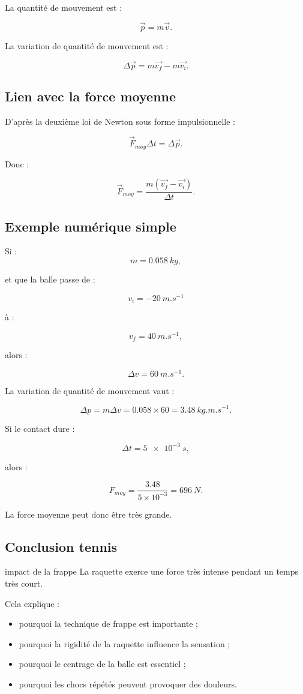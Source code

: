 \documentclass[11pt,a4paper]{article}
\begin{document}
La quantité de mouvement est :

\[
\vec{p}=m\vec{v}.
\]

La variation de quantité de mouvement est :

\[
\Delta \vec{p}=m\vec{v_f}-m\vec{v_i}.
\]

\subsection{Lien avec la force moyenne}

D'après la deuxième loi de Newton sous forme impulsionnelle :

\[
\vec{F}_{moy}\Delta t=\Delta \vec{p}.
\]

Donc :

\[
\vec{F}_{moy}=\frac{m(\vec{v_f}-\vec{v_i})}{\Delta t}.
\]

\subsection{Exemple numérique simple}

Si :
\[
m=\SI{0.058}{kg},
\]

et que la balle passe de :

\[
v_i=-\SI{20}{m.s^{-1}}
\]

à :

\[
v_f=\SI{40}{m.s^{-1}},
\]

alors :

\[
\Delta v=60\ \si{m.s^{-1}}.
\]

La variation de quantité de mouvement vaut :

\[
\Delta p=m\Delta v=0.058\times 60=3.48\ \si{kg.m.s^{-1}}.
\]

Si le contact dure :

\[
\Delta t=\SI{5e-3}{s},
\]

alors :

\[
F_{moy}=\frac{3.48}{5\times 10^{-3}}=696\ \si{N}.
\]

La force moyenne peut donc être très grande.

\subsection{Conclusion tennis}

\begin{tennis}{impact de la frappe}
La raquette exerce une force très intense pendant un temps très court.

Cela explique :
\begin{itemize}
    \item pourquoi la technique de frappe est importante ;
    \item pourquoi la rigidité de la raquette influence la sensation ;
    \item pourquoi le centrage de la balle est essentiel ;
    \item pourquoi les chocs répétés peuvent provoquer des douleurs.
\end{itemize}
\end{tennis}
\end{document}
